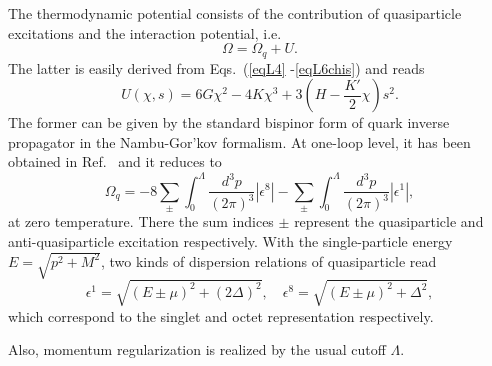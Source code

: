 \documentclass[prd, showpacs,nofootinbib,amsmath,amssymb,12pt]{revtex4}
\begin{document}

The thermodynamic potential  consists of the contribution of
quasiparticle excitations and the interaction potential, i.e.
\begin{equation}
\Omega=\Omega_q+U.
\label{eq:1loopu}
\end{equation}
The latter is easily  derived from Eqs.~(\ref{eqL4} -\ref{eqL6chis}) and reads~\cite{abuki2010nambu}
\begin{equation}
U(\chi,s) = 6G\chi^2 - 4K\chi^3 + 3(H-\frac{K'}{2}\chi)s^2.
\label{potentialterm}
\end{equation}
The former can be given by the standard 
bispinor form of quark inverse propagator in the Nambu-Gor'kov formalism.
At one-loop level, it has been obtained in Ref.~\cite{abuki2010nambu} and it reduces to
\begin{equation}
\Omega_q=-8\sum_{\pm}\int^{\Lambda}_0 \frac{d^3p}{(2\pi)^3}|\epsilon^8|
-\sum_{\pm}\int^{\Lambda}_0 \frac{d^3p}{(2\pi)^3}|\epsilon^1|,
\label{oneloopinzero}
\end{equation}
at zero temperature.
There the sum indices  $\pm$ represent the quasiparticle and anti-quasiparticle excitation respectively.
With the single-particle energy $E=\sqrt{p^2+M^2}$, two kinds of dispersion relations of quasiparticle read
\begin{equation}
\epsilon^1=\sqrt{(E\pm\mu)^2+(2\Delta)^2},\quad
\epsilon^8=\sqrt{(E\pm\mu)^2+\Delta^2},
\label{despersionzerofield}
\end{equation}
which correspond to the singlet and octet representation respectively.

Also, momentum regularization is realized by the usual cutoff $\Lambda$.
\end{document}

